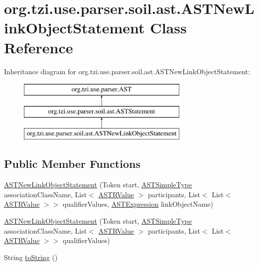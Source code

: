 \hypertarget{classorg_1_1tzi_1_1use_1_1parser_1_1soil_1_1ast_1_1_a_s_t_new_link_object_statement}{\section{org.\-tzi.\-use.\-parser.\-soil.\-ast.\-A\-S\-T\-New\-Link\-Object\-Statement Class Reference}
\label{classorg_1_1tzi_1_1use_1_1parser_1_1soil_1_1ast_1_1_a_s_t_new_link_object_statement}
}
Inheritance diagram for org.\-tzi.\-use.\-parser.\-soil.\-ast.\-A\-S\-T\-New\-Link\-Object\-Statement\-:\begin{figure}[H]
\begin{center}
\leavevmode
\includegraphics[height=3.000000cm]{classorg_1_1tzi_1_1use_1_1parser_1_1soil_1_1ast_1_1_a_s_t_new_link_object_statement}
\end{center}
\end{figure}
\subsection*{Public Member Functions}
\begin{DoxyCompactItemize}
\item 
\hyperlink{classorg_1_1tzi_1_1use_1_1parser_1_1soil_1_1ast_1_1_a_s_t_new_link_object_statement_a20cbc3dca8d126cb8a8f66e81dd2fc95}{A\-S\-T\-New\-Link\-Object\-Statement} (Token start, \hyperlink{classorg_1_1tzi_1_1use_1_1parser_1_1ocl_1_1_a_s_t_simple_type}{A\-S\-T\-Simple\-Type} association\-Class\-Name, List$<$ \hyperlink{classorg_1_1tzi_1_1use_1_1parser_1_1soil_1_1ast_1_1_a_s_t_r_value}{A\-S\-T\-R\-Value} $>$ participants, List$<$ List$<$ \hyperlink{classorg_1_1tzi_1_1use_1_1parser_1_1soil_1_1ast_1_1_a_s_t_r_value}{A\-S\-T\-R\-Value} $>$$>$ qualifier\-Values, \hyperlink{classorg_1_1tzi_1_1use_1_1parser_1_1ocl_1_1_a_s_t_expression}{A\-S\-T\-Expression} link\-Object\-Name)
\item 
\hyperlink{classorg_1_1tzi_1_1use_1_1parser_1_1soil_1_1ast_1_1_a_s_t_new_link_object_statement_a600a28d42aa8c950d74d6e47a62ac29c}{A\-S\-T\-New\-Link\-Object\-Statement} (Token start, \hyperlink{classorg_1_1tzi_1_1use_1_1parser_1_1ocl_1_1_a_s_t_simple_type}{A\-S\-T\-Simple\-Type} association\-Class\-Name, List$<$ \hyperlink{classorg_1_1tzi_1_1use_1_1parser_1_1soil_1_1ast_1_1_a_s_t_r_value}{A\-S\-T\-R\-Value} $>$ participants, List$<$ List$<$ \hyperlink{classorg_1_1tzi_1_1use_1_1parser_1_1soil_1_1ast_1_1_a_s_t_r_value}{A\-S\-T\-R\-Value} $>$$>$ qualifier\-Values)
\item 
String \hyperlink{classorg_1_1tzi_1_1use_1_1parser_1_1soil_1_1ast_1_1_a_s_t_new_link_object_statement_af7977c56e24218a01f05f6034143c22b}{to\-String} ()
\end{DoxyCompactItemize}
